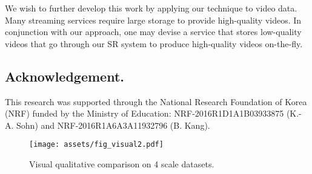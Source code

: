 \documentclass[runningheads]{llncs}
\begin{document}
We wish to further develop this work by applying our technique to video data. Many streaming services require large storage to provide high-quality videos. In conjunction with our approach, one may devise a service that stores low-quality videos that go through our SR system to produce high-quality videos on-the-fly.

\subsection*{Acknowledgement.}
This research was supported through the National Research Foundation of Korea (NRF) funded by the Ministry of Education: NRF-2016R1D1A1B03933875 (K.-A. Sohn) and NRF-2016R1A6A3A11932796 (B. Kang).

\begin{figure*}[htbp]
\centering
\texttt{[image: assets/fig\_visual2.pdf]}
\caption{Visual qualitative comparison on 4 scale datasets.}
\label{fig:comparison}
\end{figure*}



\end{document}
